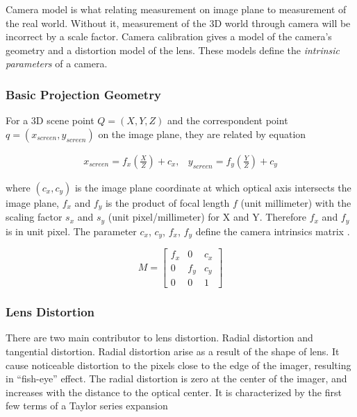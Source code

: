 Camera model is what relating measurement on image plane to
measurement of the real world. Without it, measurement of the 3D world
through camera will be incorrect by a scale factor. Camera calibration
gives a model of the camera's geometry and a distortion model of the
lens. These models define the \textit{intrinsic parameters} of a
camera. 

\subsubsection{Basic Projection Geometry}

For a 3D scene point $Q=(X, Y, Z)$ and the correspondent point $q=(x_{screen},
y_{screen})$ on the image plane, they are related by equation \cite{learning_opencv}

\begin{equation}
\begin{matrix}
x_{screen} = f_x\left(\frac{X}{Z}\right)+c_x, &
y_{screen}=f_y\left(\frac{Y}{Z}\right)+c_y
\end{matrix}
\end{equation}

\noindent where $(c_x, c_y)$ is the image plane coordinate at which optical axis
intersects the image plane, $f_x$ and $f_y$ is the product of focal
length $f$ (unit millimeter) with the scaling factor $s_x$ and $s_y$
(unit pixel/millimeter) for X and Y. Therefore $f_x$ and $f_y$ is in
unit pixel. The parameter $c_x$, $c_y$, $f_x$, $f_y$ define the camera
intrinsics matrix \cite{learning_opencv} \cite{Heikkila_four_1997}.

\begin{equation}
M = \begin{bmatrix}
f_x & 0 & c_x \\
0& f_y & c_y \\
0 & 0 & 1 \end{bmatrix}
\end{equation}

\subsubsection{Lens Distortion}
There are two main contributor to lens distortion. Radial distortion
and tangential distortion. Radial distortion arise as a result of the
shape of lens. It cause noticeable distortion to the pixels close to
the edge of the imager, resulting in ``fish-eye'' effect. The radial
distortion is zero at the center of the imager, and increases with the
distance to the optical center. It is characterized by the first few
terms of a Taylor series expansion

